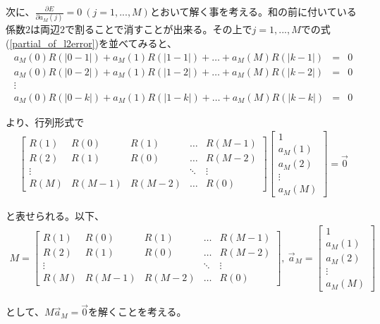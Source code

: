 \documentclass[uplatex,dvipdfmx,b5j,10pt]{jsbook}
\theoremstyle{definition}
\begin{document}
次に、$\displaystyle\frac{\partial E}{\partial a_{M}(j)} = 0\ (j=1,...,M)$とおいて解く事を考える。和の前に付いている係数$2$は両辺$2$で割ることで消すことが出来る。その上で$j=1,...,M$での式(\ref{partial_of_l2error})を並べてみると、
\begin{eqnarray*}
a_{M}(0)R(|0-1|) + a_{M}(1)R(|1-1|) + \dots + a_{M}(M)R(|k-1|) &=& 0 \\
a_{M}(0)R(|0-2|) + a_{M}(1)R(|1-2|) + \dots + a_{M}(M)R(|k-2|) &=& 0 \\
\vdots \\
a_{M}(0)R(|0-k|) + a_{M}(1)R(|1-k|) + \dots + a_{M}(M)R(|k-k|) &=& 0
\end{eqnarray*}

より、行列形式で
\begin{eqnarray*}
  \begin{bmatrix}
    R(1) & R(0) & R(1) & \dots & R(M-1) \\
    R(2) & R(1) & R(0) & \dots & R(M-2) \\
    \vdots &      &  & \ddots   & \vdots  \\
    R(M) & R(M-1) & R(M-2) & \dots & R(0) 
  \end{bmatrix}
  \begin{bmatrix}
    1 \\ a_{M}(1) \\ a_{M}(2) \\ \vdots \\ a_{M}(M) 
  \end{bmatrix}
  = \vec{0}
\end{eqnarray*}

と表せられる。以下、
\begin{eqnarray}
  M = 
  \begin{bmatrix}
    R(1) & R(0) & R(1) & \dots & R(M-1) \\
    R(2) & R(1) & R(0) & \dots & R(M-2) \\
    \vdots &      &  & \ddots   & \vdots  \\
    R(M) & R(M-1) & R(M-2) & \dots & R(0) 
  \end{bmatrix}
  , \  
  \vec{a}_{M} = 
  \begin{bmatrix}
    1 \\ a_{M}(1) \\ a_{M}(2) \\ \vdots \\ a_{M}(M) 
  \end{bmatrix}
\end{eqnarray}

として、$M\vec{a}_{M} = \vec{0}$を解くことを考える。
\end{document}
